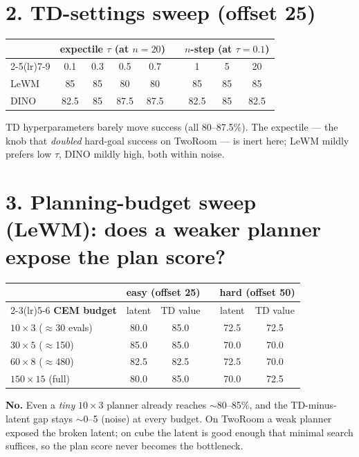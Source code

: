 \documentclass[11pt]{article}
\begin{document}
\section{2. TD-settings sweep (offset 25)}
\begin{center}\small
\renewcommand{\arraystretch}{1.2}
\begin{tabular}{l cccc c ccc}
\toprule
 & \multicolumn{4}{c}{expectile $\tau$ (at $n{=}20$)} & & \multicolumn{3}{c}{$n$-step (at $\tau{=}0.1$)} \\
\cmidrule(lr){2-5}\cmidrule(lr){7-9}
 & 0.1 & 0.3 & 0.5 & 0.7 & & 1 & 5 & 20 \\
\midrule
\textsf{LeWM} & 85 & 85 & 80 & 80 & & 85 & 85 & 85 \\
\textsf{DINO} & 82.5 & 85 & 87.5 & 87.5 & & 82.5 & 85 & 82.5 \\
\bottomrule
\end{tabular}
\end{center}
TD hyperparameters barely move success (all 80--87.5\%). The expectile --- the knob that \emph{doubled}
hard-goal success on TwoRoom --- is inert here; LeWM mildly prefers low $\tau$, DINO mildly high, both within noise.

\section{3. Planning-budget sweep (LeWM): does a weaker planner expose the plan score?}
\begin{center}\small
\renewcommand{\arraystretch}{1.2}
\begin{tabular}{l cc c cc}
\toprule
 & \multicolumn{2}{c}{easy (offset 25)} & & \multicolumn{2}{c}{hard (offset 50)} \\
\cmidrule(lr){2-3}\cmidrule(lr){5-6}
\textbf{CEM budget} & latent & TD value & & latent & TD value \\
\midrule
$10\times3$ ($\approx$30 evals) & 80.0 & 85.0 & & 72.5 & 72.5 \\
$30\times5$ ($\approx$150)      & 85.0 & 85.0 & & 70.0 & 70.0 \\
$60\times8$ ($\approx$480)      & 82.5 & 82.5 & & 72.5 & 70.0 \\
$150\times15$ (full)            & 80.0 & 85.0 & & 70.0 & 72.5 \\
\bottomrule
\end{tabular}
\end{center}
\textbf{No.} Even a \emph{tiny} $10\times3$ planner already reaches $\sim$80--85\%, and the TD-minus-latent gap
stays $\sim$0--5 (noise) at every budget. On TwoRoom a weak planner exposed the broken latent; on cube the
latent is good enough that minimal search suffices, so the plan score never becomes the bottleneck.
\end{document}

